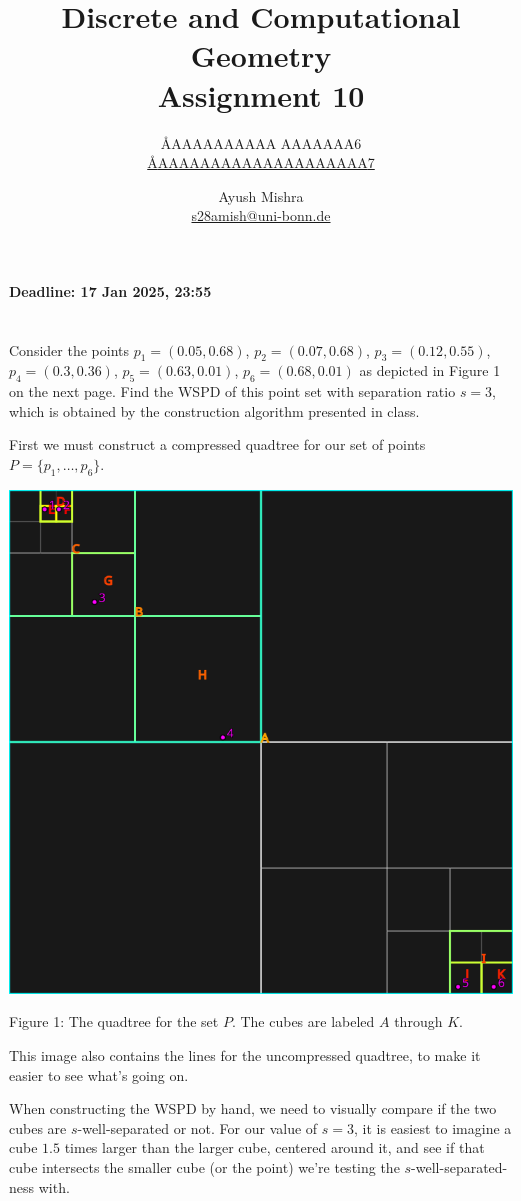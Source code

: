 \documentclass{article}
\title{Discrete and Computational Geometry \\ Assignment 10}
\author{
  \AA{AAAAAAAAAA AAAAAAA}{6} \\
  \href{mailto:\AA{AAAAAAAAAAAAAAAAAAAA}{7}}{\AA{AAAAAAAAAAAAAAAAAAAA}{7}}
  \and
  Ayush Mishra \\
  \href{mailto:s28amish@uni-bonn.de}{s28amish@uni-bonn.de}
}
\begin{document}
  \maketitle
  \begin{center}
    { \bfseries Deadline: 17 Jan 2025, 23:55 }
  \end{center}

  \section{}
  \begin{centerframebox}
    Consider the points $p_1 = (0.05, 0.68)$, $p_2 = (0.07, 0.68)$, $p_3 = (0.12, 0.55)$, $p_4 = (0.3, 0.36)$, $p_5 = (0.63, 0.01)$, $p_6 = (0.68, 0.01)$ as depicted in Figure 1 on the next page.
    Find the WSPD of this point set with separation ratio $s = 3$, which is obtained by the construction algorithm presented in class.
  \end{centerframebox}
  First we must construct a compressed quadtree for our set of points $P = \{p_1,\dots,p_6\}$.
  \begin{center}
    \includegraphics[width=.7\textwidth]{quadtree}

    Figure 1: The quadtree for the set $P$. The cubes are labeled $A$ through $K$.
  \end{center}
  This image also contains the lines for the uncompressed quadtree, to make it easier to see what's going on.

  When constructing the WSPD by hand, we need to visually compare if the two cubes are $s$-well-separated or not.
  For our value of $s=3$, it is easiest to imagine a cube $1.5$ times larger than the larger cube, centered around it, and see if that cube intersects the smaller cube (or the point) we're testing the $s$-well-separated-ness with.
\end{document}
